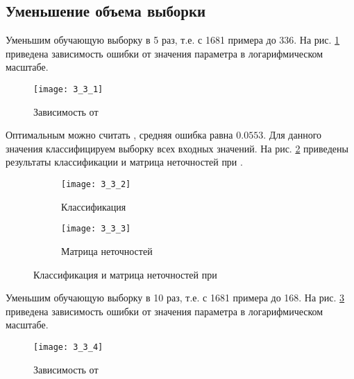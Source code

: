\subsection{Уменьшение объема выборки}


Уменьшим обучающую выборку в 5 раз, т.е. с 1681 примера до 336. На рис. \ref{fig:3_3_1} приведена зависимость ошибки  от значения параметра  в логарифмическом масштабе. 
\begin{figure}[H]
\begin{center}
	\texttt{[image: 3\_3\_1]}
	\caption{Зависимость  от }
	\label{fig:3_3_1}
\end{center}
\end{figure}

Оптимальным можно считать , средняя ошибка равна $0.0553$. Для данного значения классифицируем выборку всех входных значений. На рис. \ref{fig:3_3_2} приведены результаты классификации и матрица неточностей при .
\begin{figure}[H]
\begin{center}
	\begin{subfigure}{0.49\textwidth}
		\texttt{[image: 3\_3\_2]}
		\caption{Классификация}
	\end{subfigure}
	\begin{subfigure}{0.49\textwidth}
		\texttt{[image: 3\_3\_3]}
		\caption{Матрица неточностей}
	\end{subfigure}
	\caption{Классификация и матрица неточностей при }
	\label{fig:3_3_2}
\end{center}
\end{figure}

Уменьшим обучающую выборку в 10 раз, т.е. с 1681 примера до 168. На рис. \ref{fig:3_3_4} приведена зависимость ошибки  от значения параметра  в логарифмическом масштабе. 
\begin{figure}[H]
\begin{center}
	\texttt{[image: 3\_3\_4]}
	\caption{Зависимость  от }
	\label{fig:3_3_4}
\end{center}
\end{figure}
\vspace{-1cm}

